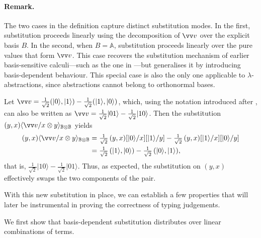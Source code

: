 \documentclass[runningheads,orivec,envcountsame,envcountsect]{llncs}
\providecommand{\qed}{\hbox{\rule{1ex}{1ex}}}%
\newcommand\ket[1]{\ensuremath{|#1\rangle}}
\newcommand\ansubst[2]{\ensuremath{\langle #1 \rangle_{#2}}}
\newcommand\AbsBasis{\ensuremath{\mathbb{A}}}
\def\C{\mathbb{C}}            %
\def\Pair#1#2{(#1,#2)} %
\newcommand\B{\mathbb B}
\begin{document}
\paragraph{Remark.}
The two cases in the definition capture distinct substitution modes.  
In the first, substitution proceeds linearly using the decomposition of
$\vv v$ over the explicit basis $B$.  
In the second, when $B=\AbsBasis$, substitution proceeds linearly over the pure
values that form $\vv v$.  
This case recovers the substitution mechanism of earlier
basis-sensitive calculi---such as the one in
\cite{DiazcaroGuillermoMiquelValironLICS19}---but generalises it by introducing
basis-dependent behaviour.  
This special case is also the only one applicable to
$\lambda$-abstractions, since abstractions cannot belong to orthonormal bases.


\begin{example}
  Let
  \(
    \vv v
    = \tfrac{1}{\sqrt{2}}\Pair{\ket{0}}{\ket{1}}
      - \tfrac{1}{\sqrt{2}}\Pair{\ket{1}}{\ket{0}}
    \),
  which, using the notation introduced after , can also be written as
  $\vv v = \tfrac{1}{\sqrt{2}}\ket{01}
           - \tfrac{1}{\sqrt{2}}\ket{10}$.
  Then the substitution
  $(y,x)\ansubst{\vv v/x\otimes y}{\B\otimes\B}$ yields
  \begin{align*}
    (y,x)\ansubst{\vv v/x\otimes y}{\B\otimes\B}
    &= \tfrac{1}{\sqrt{2}}\,(y,x)[\ket{0}/x][\ket{1}/y]
       - \tfrac{1}{\sqrt{2}}\,(y,x)[\ket{1}/x][\ket{0}/y] \\
    &= \tfrac{1}{\sqrt{2}}\,(\ket{1},\ket{0})
       - \tfrac{1}{\sqrt{2}}\,(\ket{0},\ket{1}),
  \end{align*}
  that is,
  $\tfrac{1}{\sqrt{2}}\ket{10}
   - \tfrac{1}{\sqrt{2}}\ket{01}$.
  Thus, as expected, the substitution on $(y,x)$ effectively swaps the two
  components of the pair.
\end{example}

With this new substitution in place, we can establish a few properties that
will later be instrumental in proving the correctness of typing judgements.

We first show that basis-dependent substitution distributes over linear
combinations of terms.

\end{document}
